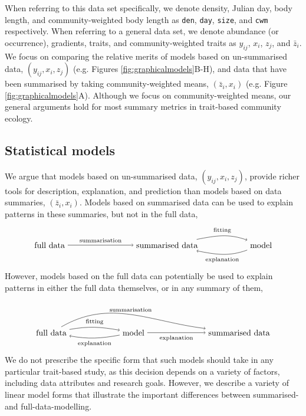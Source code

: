 \documentclass[12pt]{ecology}
\begin{document}
When referring to this data set specifically, we denote density, Julian day, body length, and community-weighted body length as \texttt{den}, \texttt{day}, \texttt{size}, and \texttt{cwm} respectively.  When referring to a general data set, we denote abundance (or occurrence), gradients, traits, and community-weighted traits as $y_{ij}$, $x_i$, $z_j$, and $\bar{z}_i$.  We focus on comparing the relative merits of models based on un-summarised data, $(y_{ij}, x_i, z_j)$ (e.g. Figures \ref{fig:graphicalmodels}B-H), and data that have been summarised by taking community-weighted means, $(\bar{z}_i, x_i)$ (e.g. Figure \ref{fig:graphicalmodels}A).  Although we focus on community-weighted means, our general arguments hold for most summary metrics in trait-based community ecology.

\subsection{Statistical models}

We argue that models based on un-summarised data, $(y_{ij}, x_i, z_j)$, provide richer tools for description, explanation, and prediction than models based on data summaries, $(\bar{z}_i, x_i)$.  Models based on  summarised data can be used to explain patterns in these summaries, but not in the full data,
\begin{equation}
\begin{tikzpicture}
  \node (full) at (0,0) {full data};
  \node (sum) at (5,0) {summarised data};
  \node (mod) at (9,0) {model};
  \draw[->] (full) to node [above]
    {\scriptsize summarisation} (sum);
  \draw[->] (sum) to [out = 11, in = 160] node [above]
    {\scriptsize fitting} (mod);
  \draw[->] (mod) to [out = -160, in = -11] node [below]
    {\scriptsize explanation} (sum);
\end{tikzpicture}
\end{equation}
However, models based on the full data can potentially be used to explain patterns in either the full data themselves, or in any summary of them,
\begin{equation}
\begin{tikzpicture}
  \node (full) at (0,0) {full data};
  \node (mod) at (3.5,0) {model};
  \node (sum) at (8,0) {summarised data};
  \draw[->] (full) to [out = 10, in = 170] node [above] 
    {\scriptsize fitting} (mod);
  \draw[->] (mod) to [out = -170, in = -10] node [below]
    {\scriptsize explanation} (full);
  \draw[->] (full) to [out = 30, in = 173] node [above]
    {\scriptsize summarisation} (sum);
  \draw[->] (mod) to node [below]
    {\scriptsize explanation} (sum);
\end{tikzpicture}
\end{equation}
We do not prescribe the specific form that such models should take in any particular trait-based study, as this decision depends on a variety of factors, including data attributes and research goals.  However, we describe a variety of linear model forms that illustrate the important differences between summarised- and full-data-modelling.
\end{document}
